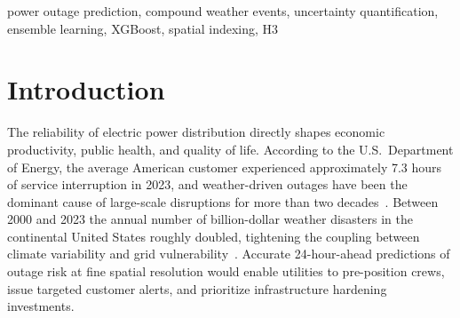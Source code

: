 \documentclass[conference]{IEEEtran}
\begin{document}
\begin{abstract}
Weather-related events account for approximately 80\% of major power service interruptions in the United States, while many prediction studies model hazards independently and report uncalibrated point estimates. We present a research prototype for exploring compound-event features, calibrated uncertainty, and configuration-driven transfer experiments. We introduce co-occurrence and sequential-escalation features across six weather categories and combine XGBoost and LightGBM probabilities before post-hoc isotonic calibration. Using 1{,}945 geocoded NOAA Storm Events from Texas (2022) mapped to H3 resolution-7 hexagonal cells ($\sim$5.16~km$^2$), we generate physics-informed synthetic outage targets and evaluate 12{,}000 samples with 138 engineered features. XGBoost reaches AUC-ROC 0.967; the two-tree probability average reaches AUC-ROC 0.966 (95\% bootstrap CI: 0.944--0.984) and F1~=~0.947 at threshold 0.39. Isotonic calibration reduces Expected Calibration Error from 0.267 to 0.004 on this synthetic-target benchmark. Experiments on California- and Florida-context fixtures produced by the same target generator show small AUC gaps relative to locally trained models, but do not establish generalization to measured utility outages. Feature ablation identifies temporal features as the dominant predictor group ($\Delta$AUC~=~0.479); compound-feature ablation has negligible aggregate AUC impact in this setup. Code and processed research fixtures are available at https://github.com/DarthAether/outage-prediction-system.
\end{abstract}

\begin{IEEEkeywords}
power outage prediction, compound weather events, uncertainty quantification, ensemble learning, XGBoost, spatial indexing, H3
\end{IEEEkeywords}

\section{Introduction}

The reliability of electric power distribution directly shapes economic productivity, public health, and quality of life. According to the U.S.\ Department of Energy, the average American customer experienced approximately 7.3 hours of service interruption in 2023, and weather-driven outages have been the dominant cause of large-scale disruptions for more than two decades~\cite{doe2024outage}. Between 2000 and 2023 the annual number of billion-dollar weather disasters in the continental United States roughly doubled, tightening the coupling between climate variability and grid vulnerability~\cite{kenward2014blackout}. Accurate 24-hour-ahead predictions of outage risk at fine spatial resolution would enable utilities to pre-position crews, issue targeted customer alerts, and prioritize infrastructure hardening investments.
\end{document}
